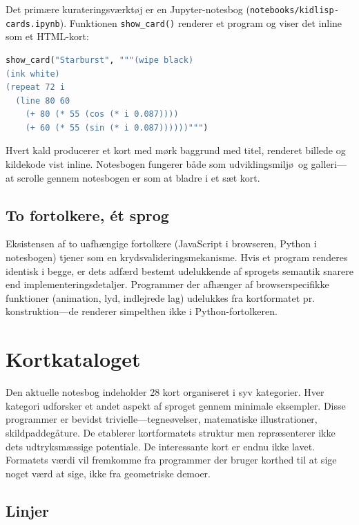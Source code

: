 \documentclass[10pt,letterpaper,twocolumn]{article}
\begin{document}
Det prim\ae re kurateringsv\ae rkt\o j er en Jupyter-notesbog (\texttt{notebooks/kidlisp-cards.ipynb}). Funktionen \texttt{show\_card()} renderer et program og viser det inline som et HTML-kort:

\begin{lstlisting}[language=python,basicstyle=\ttfamily\footnotesize]
show_card("Starburst", """(wipe black)
(ink white)
(repeat 72 i
  (line 80 60
    (+ 80 (* 55 (cos (* i 0.087))))
    (+ 60 (* 55 (sin (* i 0.087))))))""")
\end{lstlisting}

Hvert kald producerer et kort med m\o rk baggrund med titel, renderet billede og kildekode vist inline. Notesbogen fungerer b\aa de som udviklingsmilj\o\ og galleri---at scrolle gennem notesbogen er som at bladre i et s\ae t kort.

\subsection{To fortolkere, \'{e}t sprog}

Eksistensen af to uafh\ae ngige fortolkere (JavaScript i browseren, Python i notesbogen) tjener som en krydsvalideringsmekanisme. Hvis et program renderes identisk i begge, er dets adf\ae rd bestemt udelukkende af sprogets semantik snarere end implementeringsdetaljer. Programmer der afh\ae nger af browserspecifikke funktioner (animation, lyd, indlejrede lag) udelukkes fra kortformatet pr. konstruktion---de renderer simpelthen ikke i Python-fortolkeren.


\section{Kortkataloget}
\label{sec:catalog}

Den aktuelle notesbog indeholder 28 kort organiseret i syv kategorier. Hver kategori udforsker et andet aspekt af sproget gennem minimale eksempler. Disse programmer er bevidst trivielle---tegne\o velser, matematiske illustrationer, skildpaddeg\aa ture. De etablerer kortformatets struktur men repr\ae senterer ikke dets udtryksm\ae ssige potentiale. De interessante kort er endnu ikke lavet. Formatets v\ae rdi vil fremkomme fra programmer der bruger korthed til at sige noget v\ae rd at sige, ikke fra geometriske demoer.

\subsection{Linjer}
\end{document}
